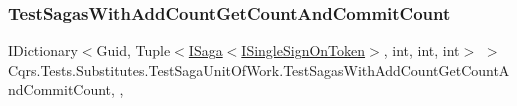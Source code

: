 \subsubsection{\texorpdfstring{Test\+Sagas\+With\+Add\+Count\+Get\+Count\+And\+Commit\+Count}{TestSagasWithAddCountGetCountAndCommitCount}}
{\footnotesize\ttfamily I\+Dictionary$<$Guid, Tuple$<$\hyperlink{interfaceCqrs_1_1Domain_1_1ISaga}{I\+Saga}$<$\hyperlink{interfaceCqrs_1_1Authentication_1_1ISingleSignOnToken}{I\+Single\+Sign\+On\+Token}$>$, int, int, int$>$ $>$ Cqrs.\+Tests.\+Substitutes.\+Test\+Saga\+Unit\+Of\+Work.\+Test\+Sagas\+With\+Add\+Count\+Get\+Count\+And\+Commit\+Count\hspace{0.3cm}{\ttfamily [static]}, {\ttfamily [get]}, {\ttfamily [set]}}

